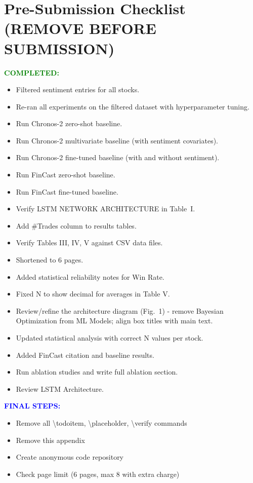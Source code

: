 \documentclass[a4paper,10pt,conference]{IEEEtran}
\begin{document}
\section*{Pre-Submission Checklist (REMOVE BEFORE SUBMISSION)}
\textcolor{green}{\textbf{COMPLETED:}}
\begin{itemize}
    \item[$\checkmark$] Filtered sentiment entries for all stocks.
    \item[$\checkmark$] Re-ran all experiments on the filtered dataset with hyperparameter tuning.
    \item[$\checkmark$] Run Chronos-2 zero-shot baseline.
    \item[$\checkmark$] Run Chronos-2 multivariate baseline (with sentiment covariates).
    \item[$\checkmark$] Run Chronos-2 fine-tuned baseline (with and without sentiment).
    \item[$\checkmark$] Run FinCast zero-shot baseline.
    \item[$\checkmark$] Run FinCast fine-tuned baseline.
    \item[$\checkmark$] Verify LSTM NETWORK ARCHITECTURE in Table~I.
    \item[$\checkmark$] Add \#Trades column to results tables.
    \item[$\checkmark$] Verify Tables III, IV, V against CSV data files.
    \item[$\checkmark$] Shortened to 6 pages.
    \item[$\checkmark$] Added statistical reliability notes for Win Rate.
    \item[$\checkmark$] Fixed N to show decimal for averages in Table V.
    \item[$\checkmark$] Review/refine the architecture diagram (Fig.~1) - remove Bayesian Optimization from ML Models; align box titles with main text.
    \item[$\checkmark$] Updated statistical analysis with correct N values per stock.
    \item[$\checkmark$] Added FinCast citation and baseline results.
    \item[$\checkmark$] Run ablation studies and write full ablation section.
    \item[$\checkmark$] Review LSTM Architecture.
\end{itemize}
\textcolor{blue}{\textbf{FINAL STEPS:}}
\begin{itemize}
    \item[$\square$] Remove all \textbackslash todoitem, \textbackslash placeholder, \textbackslash verify commands
    \item[$\square$] Remove this appendix
    \item[$\square$] Create anonymous code repository
    \item[$\square$] Check page limit (6 pages, max 8 with extra charge)
\end{itemize}
\fi
\end{document}
